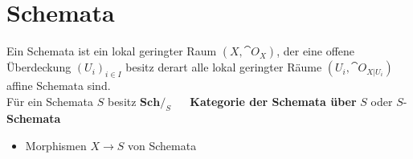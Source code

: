 \section{Schemata}

\begin{defn}
	Ein Schemata ist ein lokal geringter Raum $(X,\cat{O}_X)$, der eine offene Überdeckung $(U_i)_{i\in I}$
	besitz derart alle lokal geringter Räume $(U_i,\cat{O}_{X|U_i})$ affine Schemata sind.\\
	Für ein Schemata $S$ besitz $\textbf{Sch}/_{S}$ ~~ \textbf{Kategorie der Schemata über} $S$ oder $S$-\textbf{Schemata}\\
	\begin{itemize}
		\item Morphismen $X \rightarrow S$ von Schemata
	\end{itemize}
\end{defn}
